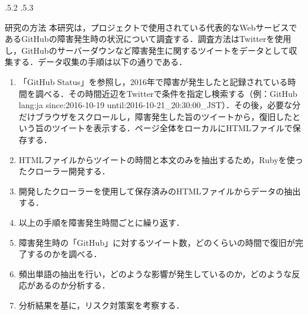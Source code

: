 \documentclass[uplatex]{jsarticle}
\makeatletter
\renewcommand{\section}{%
    \if@slide\clearpage\fi
    \@startsection{section}{1}{\z@}%
    {\Cvs \@plus.5\Cdp \@minus.2\Cdp}%
    {.5\Cvs \@plus.3\Cdp}%
    {\normalfont\raggedright}}
\makeatother
\begin{document}
\section{研究の方法}
本研究は，プロジェクトで使用されている代表的なWebサービスであるGitHubの障害発生時の状況について調査する．調査方法はTwitterを使用し，GitHubのサーバーダウンなど障害発生に関するツイートをデータとして収集する．データ収集の手順は以下の通りである\cite{03}．
\begin{enumerate}
 \item 「GitHub Status」を参照し，2016年で障害が発生したと記録されている時間を調べる．その時間近辺をTwitterで条件を指定し検索する（例：GitHub lang:ja since:2016-10-19 until:2016-10-21\_20:30:00\_JST）．その後，必要な分だけブラウザをスクロールし，障害発生した旨のツイートから，復旧したという旨のツイートを表示する．ページ全体をローカルにHTMLファイルで保存する．
 \item HTMLファイルからツイートの時間と本文のみを抽出するため，Rubyを使ったクローラー開発する\cite{04}．
 \item 開発したクローラーを使用して保存済みのHTMLファイルからデータの抽出する．
 \item 以上の手順を障害発生時間ごとに繰り返す．
 \item 障害発生時の「GitHub」に対するツイート数，どのくらいの時間で復旧が完了するのかを調べる．
 \item 頻出単語の抽出を行い，どのような影響が発生しているのか，どのような反応があるのか分析する．
 \item 分析結果を基に，リスク対策案を考察する．
\end{enumerate}
\end{document}
